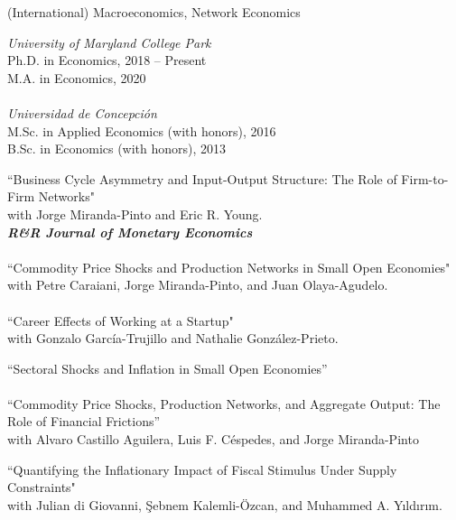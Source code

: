 \documentclass[10pt]{article}
\begin{document}
\begin{description}[leftmargin=10em,style=nextline]
    \item[Research Interests] (International) Macroeconomics, Network Economics
    \item[Education] {\itshape University of Maryland College Park}\\
    Ph.D. in Economics, 2018 --  Present\\
    M.A. in Economics, 2020\\ 
    \\[-0.1in]
{\itshape Universidad de Concepci\'on}\\
M.Sc. in Applied Economics (with honors), 2016 \\
B.Sc. in Economics (with honors), 2013\\[-.1in]
    \item[Working Papers] ``Business Cycle Asymmetry and Input-Output Structure: The Role of Firm-to-Firm Networks"\\
    with Jorge Miranda-Pinto and Eric R. Young.\\
    \textbf{\textit{R\&R Journal of Monetary Economics}}\\
    \\[-0.1in]
     ``Commodity Price Shocks and Production Networks in Small Open Economies"\\
     with Petre Caraiani, Jorge Miranda-Pinto, and Juan Olaya-Agudelo.\\
    \\[-0.1in]
      ``Career Effects of Working at a Startup"\\
     with Gonzalo Garc\'ia-Trujillo and Nathalie Gonz\'alez-Prieto.\\
     \item[Work in Progress] ``Sectoral Shocks and Inflation in Small Open Economies''\\
     \\[-0.1in]
     ``Commodity Price Shocks, Production Networks, and Aggregate Output: The Role of Financial Frictions''\\
      with Alvaro Castillo Aguilera, Luis F. C\'espedes, and Jorge Miranda-Pinto\\[-.1in]
     \item[Published Papers ] ``Quantifying the Inflationary Impact of Fiscal Stimulus Under Supply Constraints"\\
      with Julian di Giovanni, \c{S}ebnem Kalemli-\"{O}zcan, and Muhammed A. Y{\i}ld{\i}r{\i}m. \\

\end{description}
\end{document}
